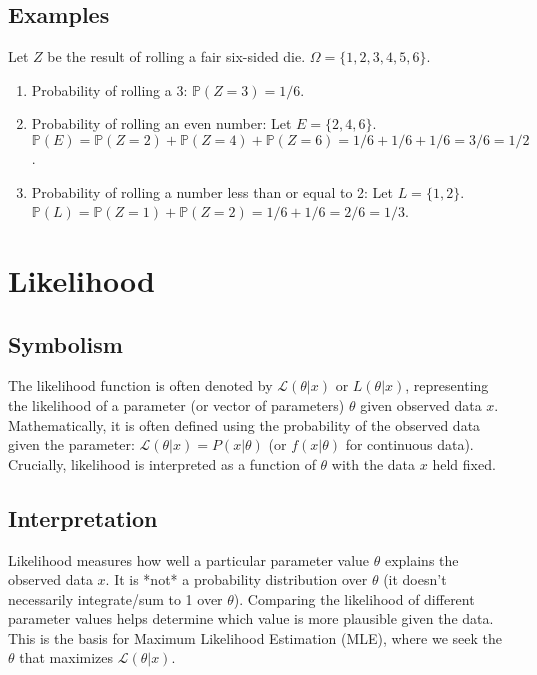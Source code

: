 \documentclass{article}
\newcommand{\Prob}{\mathbb{P}} %
\newcommand{\Lik}{\mathcal{L}} %
\begin{document}
\subsection*{Examples}
Let $Z$ be the result of rolling a fair six-sided die. $\Omega = \{1, 2, 3, 4, 5, 6\}$.
\begin{enumerate}
    \item Probability of rolling a 3: $\Prob(Z=3) = 1/6$.
    \item Probability of rolling an even number: Let $E = \{2, 4, 6\}$. $\Prob(E) = \Prob(Z=2) + \Prob(Z=4) + \Prob(Z=6) = 1/6 + 1/6 + 1/6 = 3/6 = 1/2$.
    \item Probability of rolling a number less than or equal to 2: Let $L = \{1, 2\}$. $\Prob(L) = \Prob(Z=1) + \Prob(Z=2) = 1/6 + 1/6 = 2/6 = 1/3$.
\end{enumerate}

\section{Likelihood}

\subsection*{Symbolism}
The likelihood function is often denoted by $\Lik(\theta | x)$ or $L(\theta | x)$, representing the likelihood of a parameter (or vector of parameters) $\theta$ given observed data $x$. Mathematically, it is often defined using the probability of the observed data given the parameter: $\Lik(\theta | x) = P(x | \theta)$ (or $f(x | \theta)$ for continuous data). Crucially, likelihood is interpreted as a function of $\theta$ with the data $x$ held fixed.

\subsection*{Interpretation}
Likelihood measures how well a particular parameter value $\theta$ explains the observed data $x$. It is *not* a probability distribution over $\theta$ (it doesn't necessarily integrate/sum to 1 over $\theta$). Comparing the likelihood of different parameter values helps determine which value is more plausible given the data. This is the basis for Maximum Likelihood Estimation (MLE), where we seek the $\theta$ that maximizes $\Lik(\theta | x)$.
\end{document}
